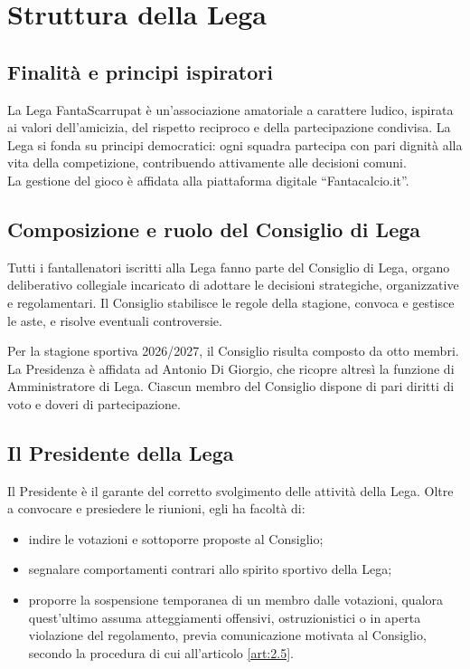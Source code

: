 \chapter{Struttura della Lega}
\label{cap:struttura-lega}

\section{Finalità e principi ispiratori}
\label{art:1.1}

La Lega FantaScarrupat è un'associazione amatoriale a carattere ludico, ispirata ai valori dell'amicizia, del rispetto reciproco e della partecipazione condivisa. La Lega si fonda su principi democratici: ogni squadra partecipa con pari dignità alla vita della competizione, contribuendo attivamente alle decisioni comuni.\\
La gestione del gioco è affidata alla piattaforma digitale “Fantacalcio.it”.

\section{Composizione e ruolo del Consiglio di Lega}
\label{art:1.2}

Tutti i fantallenatori iscritti alla Lega fanno parte del Consiglio di Lega, organo deliberativo collegiale incaricato di adottare le decisioni strategiche, organizzative e regolamentari. Il Consiglio stabilisce le regole della stagione, convoca e gestisce le aste, e risolve eventuali controversie.

Per la stagione sportiva 2026/2027, il Consiglio risulta composto da otto membri. La Presidenza è affidata ad Antonio Di Giorgio, che ricopre altresì la funzione di Amministratore di Lega. Ciascun membro del Consiglio dispone di pari diritti di voto e doveri di partecipazione.

\section{Il Presidente della Lega}
\label{art:1.3}

Il Presidente è il garante del corretto svolgimento delle attività della Lega. Oltre a convocare e presiedere le riunioni, egli ha facoltà di:
\begin{itemize}
\item indire le votazioni e sottoporre proposte al Consiglio;
\item segnalare comportamenti contrari allo spirito sportivo della Lega;
\item proporre la sospensione temporanea di un membro dalle votazioni, qualora quest'ultimo assuma atteggiamenti offensivi, ostruzionistici o in aperta violazione del regolamento, previa comunicazione motivata al Consiglio, secondo la procedura di cui all'articolo \ref{art:2.5}.
\end{itemize}

